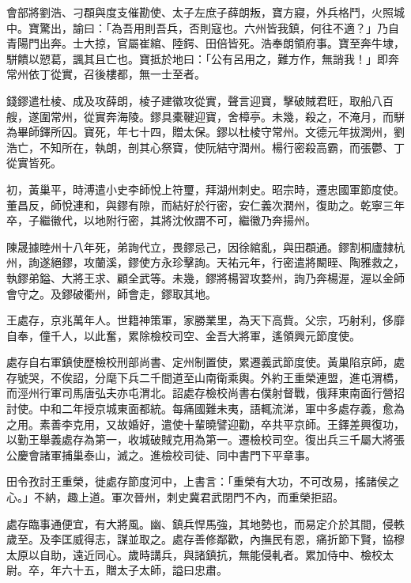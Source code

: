 \begin{pinyinscope}
 會部將劉浩、刁頵與度支催勘使、太子左庶子薛朗叛，寶方寢，外兵格鬥，火照城中。寶驚出，諭曰：「為吾用則吾兵，否則寇也。六州皆我鎮，何往不適？」乃自青陽門出奔。士大掠，官屬崔綰、陸鍔、田倍皆死。浩奉朗領府事。寶至奔牛埭，駢饋以愬葛，諷其且亡也。寶抵於地曰：「公有呂用之，難方作，無誚我！」即奔常州依丁從實，召後樓都，無一士至者。



 錢鏐遣杜棱、成及攻薛朗，棱子建徽攻從實，聲言迎寶，擊破賊君旺，取船八百艘，遂圍常州，從實奔海陵。鏐具橐鞬迎寶，舍樟亭。未幾，殺之，不淹月，而駢為畢師鐸所囚。寶死，年七十四，贈太保。鏐以杜棱守常州。文德元年拔潤州，劉浩亡，不知所在，執朗，剖其心祭寶，使阮結守潤州。楊行密殺高霸，而張鬱、丁從實皆死。



 初，黃巢平，時溥遣小史李師悅上符璽，拜湖州刺史。昭宗時，遷忠國軍節度使。董昌反，師悅連和，與鏐有隙，而結好於行密，安仁義次潤州，復助之。乾寧三年卒，子繼徽代，以地附行密，其將沈攸謂不可，繼徽乃奔揚州。



 陳晟據睦州十八年死，弟詢代立，畏鏐忌己，因徐綰亂，與田頵通。鏐割桐廬隸杭州，詢遂絕鏐，攻蘭溪，鏐使方永珍擊詢。天祐元年，行密遣將闞晊、陶雅救之，執鏐弟鎰、大將王求、顧全武等。未幾，鏐將楊習攻婺州，詢乃奔楊渥，渥以金師會守之。及鏐破衢州，師會走，鏐取其地。



 王處存，京兆萬年人。世籍神策軍，家勝業里，為天下高貲。父宗，巧射利，侈靡自奉，僮千人，以此奮，累除檢校司空、金吾大將軍，遙領興元節度使。



 處存自右軍鎮使歷檢校刑部尚書、定州制置使，累遷義武節度使。黃巢陷京師，處存號哭，不俟詔，分麾下兵二千間道至山南衛乘輿。外約王重榮連盟，進屯渭橋，而涇州行軍司馬唐弘夫亦屯渭北。詔處存檢校尚書右僕射督戰，俄拜東南面行營招討使。中和二年授京城東面都統。每痛國難未夷，語輒流涕，軍中多處存義，愈為之用。素善李克用，又故婚好，遣使十輩曉譬迎勸，卒共平京師。王鐸差興復功，以勤王舉義處存為第一，收城破賊克用為第一。遷檢校司空。復出兵三千屬大將張公慶會諸軍捕巢泰山，滅之。進檢校司徒、同中書門下平章事。



 田令孜討王重榮，徙處存節度河中，上書言：「重榮有大功，不可改易，搖諸侯之心。」不納，趣上道。軍次晉州，刺史冀君武閉門不內，而重榮拒詔。



 處存臨事通便宜，有大將風。幽、鎮兵悍馬強，其地勢也，而易定介於其間，侵軼歲至。及李匡威得志，謀並取之。處存善修鄰歡，內撫民有恩，痛折節下賢，協穆太原以自助，遠近同心。歲時講兵，與諸鎮抗，無能侵軋者。累加侍中、檢校太尉。卒，年六十五，贈太子太師，謚曰忠肅。




\end{pinyinscope}
